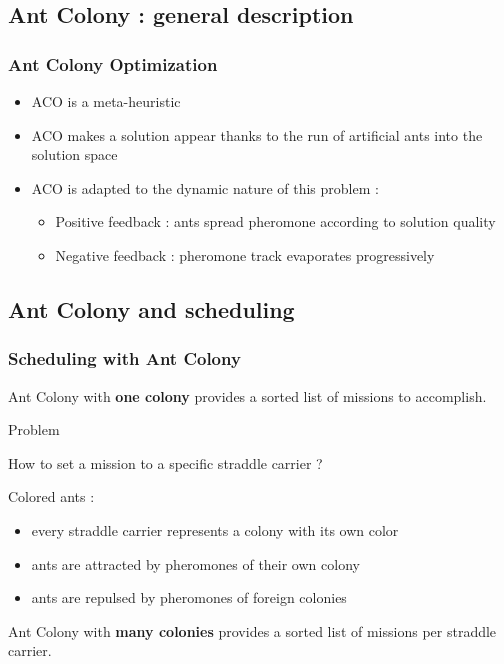 \documentclass{beamer}
\begin{document}
\subsection*{Ant Colony : general description}
\begin{frame}
\frametitle{Ant Colony Optimization\cite{Dorigo91}}
	\begin{itemize}
 		\item ACO is a meta-heuristic
		\item ACO makes a solution appear thanks to the run of artificial ants into the solution space
		\item ACO is adapted to the dynamic nature of this problem :
		\begin{itemize}
		     \item Positive feedback : ants spread pheromone according to solution quality
		     \item Negative feedback : pheromone track evaporates progressively
		\end{itemize}

	\end{itemize}
	
\end{frame}
\subsection*{Ant Colony and scheduling}
\begin{frame}
\frametitle{Scheduling with Ant Colony}
 	
	Ant Colony with \textbf{one colony} provides a sorted list of missions to accomplish.
	\pause
	\begin{block}{Problem}
		\begin{center}
			How to set a mission to a specific straddle carrier ?
		\end{center}
	\end{block}

	
	\pause
	\begin{block}{Colored ants\cite{Bertelle02} : }
	\begin{itemize}
 		\item every straddle carrier represents a colony with its own color
		\item ants are attracted by pheromones of their own colony
		\item ants are repulsed by pheromones of foreign colonies
	\end{itemize}
	\end{block}
	\pause
	Ant Colony with \textbf{many colonies} provides a sorted list of missions per straddle carrier.
	
\end{frame}
\end{document}

